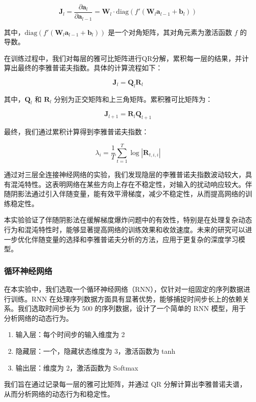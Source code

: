 \documentclass[12pt,a4paper]{amsart}
\begin{document}
\[
\mathbf{J}_l = \frac{\partial \mathbf{a}_l}{\partial \mathbf{a}_{l-1}} = \mathbf{W}_l \cdot \text{diag}(f'(\mathbf{W}_l \mathbf{a}_{l-1} + \mathbf{b}_l))
\]

其中，\(\text{diag}(f'(\mathbf{W}_l \mathbf{a}_{l-1} + \mathbf{b}_l))\) 是一个对角矩阵，其对角元素为激活函数 \(f\) 的导数。

在训练过程中，我们对每层的雅可比矩阵进行QR分解，累积每一层的结果，并计算出最终的李雅普诺夫指数。具体的计算流程如下：

\[
\mathbf{J}_l = \mathbf{Q}_l \mathbf{R}_l
\]

其中，\(\mathbf{Q}_l\) 和 \(\mathbf{R}_l\) 分别为正交矩阵和上三角矩阵。累积雅可比矩阵为：

\[
\mathbf{J}_{l+1} = \mathbf{R}_l \mathbf{Q}_{l+1}
\]

最终，我们通过累积计算得到李雅普诺夫指数：

\[
\lambda_i = \frac{1}{T} \sum_{t=1}^T \log |\mathbf{R}_{t,i,i}|
\]

通过对三层全连接神经网络的实验，我们发现隐层的李雅普诺夫指数波动较大，具有混沌特性。这表明网络在某些方向上存在不稳定性，对输入的扰动响应较大。伴随阴影法通过引入伴随变量，能有效平滑梯度，减少不稳定性，从而提高网络的训练稳定性。

本实验验证了伴随阴影法在缓解梯度爆炸问题中的有效性，特别是在处理复杂动态行为和混沌特性时，能够显著提高网络的训练效果和收敛速度。未来的研究可以进一步优化伴随变量的选择和李雅普诺夫分析的方法，应用于更复杂的深度学习模型。

\subsubsection{循环神经网络}

在本实验中，我们选取一个循环神经网络（RNN），仅针对一组固定的序列数据进行训练。RNN 在处理序列数据方面具有显著优势，能够捕捉时间步长上的依赖关系。我们选取时间步长为 500 的序列数据，设计了一个简单的 RNN 模型，用于分析网络的动态行为。

\begin{enumerate}
   \item 输入层：每个时间步的输入维度为 2
   \item 隐藏层：一个，隐藏状态维度为 3，激活函数为 tanh
   \item 输出层：维度为 2，激活函数为 Softmax
\end{enumerate}

我们旨在通过记录每一层的雅可比矩阵，并通过 QR 分解计算出李雅普诺夫谱，从而分析网络的动态行为和稳定性。
\end{document}

